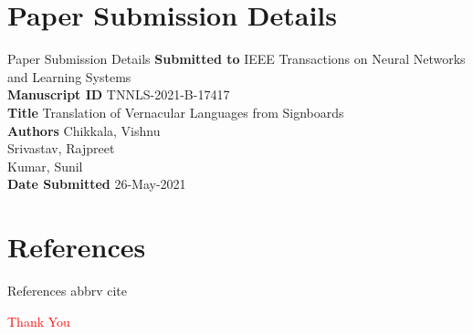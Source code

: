 \documentclass{beamer}
\begin{document}
\section{Paper Submission Details}
\begin{frame}[allowframebreaks]{Paper Submission Details}
	\textbf{Submitted to} IEEE Transactions on Neural Networks and Learning Systems \\
	\textbf{Manuscript ID} TNNLS-2021-B-17417 \\
	\textbf{Title} Translation of Vernacular Languages from Signboards \\
	\textbf{Authors} Chikkala, Vishnu \\ Srivastav, Rajpreet \\ Kumar, Sunil \\
	\textbf{Date Submitted} 26-May-2021
\end{frame}

\section{References}
\begin{frame}[allowframebreaks]{References}
	 {abbrv}
	 {cite}
\end{frame}

\begin{frame}
	\begin{center}
	\LARGE
	\textcolor{red}{Thank You}
	\end{center}
\end{frame}
\end{document}
